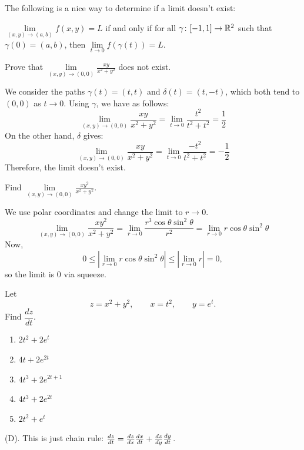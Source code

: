 The following is a nice way to determine if a limit doesn't exist:
\begin{theorem}
    $\lim \limits_{(x,y) \rightarrow (a,b)} f(x,y) = L$ if and only if for all
    $\gamma \colon [-1,1] \rightarrow \mathbb{R}^2$ such that $\gamma(0) = (a,b)$, then 
    $\lim \limits_{t \to 0} f(\gamma(t)) = L$.
\end{theorem}

\begin{exercise}
Prove that $\lim \limits_{(x,y) \rightarrow (0,0)} \frac{xy}{x^2 + y^2}$
does not exist.
\end{exercise}
\begin{solution}
We consider the paths $\gamma(t) = (t,t)$ and $\delta(t) = (t,-t)$, which both 
tend to $(0,0)$ as $t \rightarrow 0$. Using $\gamma$, we have as follows:
\[
\lim \limits_{(x,y) \rightarrow (0,0)} \frac{xy}{x^2 + y^2} =
\lim \limits_{t \rightarrow 0} \frac{t^2}{t^2 + t^2} = \frac{1}{2}
\]    
On the other hand, $\delta$ gives:
\[
\lim \limits_{(x,y) \rightarrow (0,0)} \frac{xy}{x^2 + y^2} =
\lim \limits_{t \rightarrow 0} \frac{-t^2}{t^2 + t^2} = -\frac{1}{2}
\]    
Therefore, the limit doesn't exist.
\end{solution}

\begin{exercise}
Find $\lim \limits_{(x,y) \rightarrow (0,0)} \frac{xy^2}{x^2 + y^2}$.
\end{exercise}
\begin{solution}
We use polar coordinates and change the limit to $r \to 0$.
\[
\lim \limits_{(x,y) \rightarrow (0,0)} \frac{xy^2}{x^2 + y^2} = 
\lim \limits_{r \rightarrow 0} \frac{r^3\cos \theta \sin^2\theta}{r^2} =
\lim \limits_{r \rightarrow 0} r\cos \theta \sin^2 \theta
\]
Now,
\[
0 \leq |\lim \limits_{r \rightarrow 0} r\cos \theta \sin^2 \theta| \leq 
|\lim \limits_{r \rightarrow 0} r | = 0,
\]
so the limit is $0$ via squeeze.
\end{solution}

\begin{exercise}
Let
\[
z=x^2+y^2,
\qquad
x=t^2,
\qquad
y=e^t.
\]
Find $\dfrac{dz}{dt}$.
\begin{enumerate}[label=(\Alph*)]
    \item $2t^2+2e^t$
    \item $4t+2e^{2t}$
    \item $4t^3+2e^{2t+1}$
    \item $4t^3+2e^{2t}$
    \item $2t^2+e^t$
\end{enumerate}
\end{exercise}
\begin{solution}
(D). This is just chain rule: 
$\frac{dz}{dt} = \frac{d z}{d x}\frac{d x}{d t} + \frac{d z}{d y}\frac{d y}{d t}$.
\end{solution}

